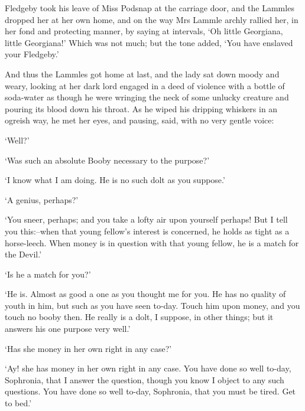 Fledgeby took his leave of Miss Podsnap at the carriage door, and the
Lammles dropped her at her own home, and on the way Mrs Lammle archly
rallied her, in her fond and protecting manner, by saying at intervals,
‘Oh little Georgiana, little Georgiana!’ Which was not much; but the
tone added, ‘You have enslaved your Fledgeby.’

And thus the Lammles got home at last, and the lady sat down moody and
weary, looking at her dark lord engaged in a deed of violence with a
bottle of soda-water as though he were wringing the neck of some unlucky
creature and pouring its blood down his throat. As he wiped his dripping
whiskers in an ogreish way, he met her eyes, and pausing, said, with no
very gentle voice:

‘Well?’

‘Was such an absolute Booby necessary to the purpose?’

‘I know what I am doing. He is no such dolt as you suppose.’

‘A genius, perhaps?’

‘You sneer, perhaps; and you take a lofty air upon yourself perhaps!
But I tell you this:--when that young fellow’s interest is concerned,
he holds as tight as a horse-leech. When money is in question with that
young fellow, he is a match for the Devil.’

‘Is he a match for you?’

‘He is. Almost as good a one as you thought me for you. He has no
quality of youth in him, but such as you have seen to-day. Touch him
upon money, and you touch no booby then. He really is a dolt, I suppose,
in other things; but it answers his one purpose very well.’

‘Has she money in her own right in any case?’

‘Ay! she has money in her own right in any case. You have done so well
to-day, Sophronia, that I answer the question, though you know I object
to any such questions. You have done so well to-day, Sophronia, that you
must be tired. Get to bed.’


